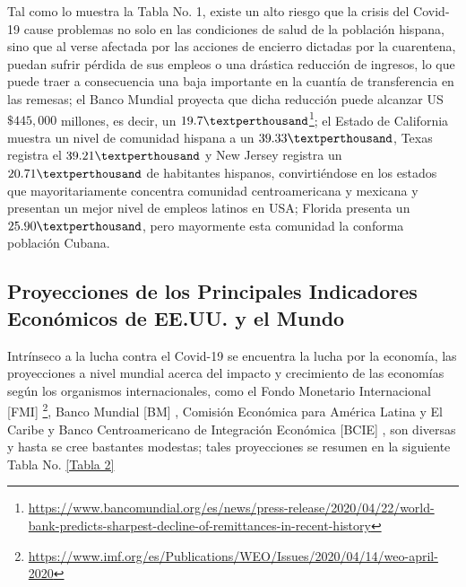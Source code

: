 Tal como lo muestra la Tabla No. 1, existe un alto riesgo que la crisis del Covid-19 cause problemas no solo en las condiciones de salud de la población hispana, sino que al verse afectada por las acciones de encierro dictadas por la cuarentena, puedan sufrir pérdida de sus empleos o una drástica reducción de ingresos, lo que puede traer a consecuencia una baja importante en la cuantía de transferencia en las remesas; el Banco Mundial proyecta que dicha reducción puede alcanzar US$\$ 445,000$ millones, es decir, un $19.7 \textperthousand$\footnote{\href{https://www.bancomundial.org/es/news/press-release/2020/04/22/world-bank-predicts-sharpest-decline-of-remittances-in-recent-history}{https://www.bancomundial.org/es/news/press-release/2020/04/22/world-bank-predicts-sharpest-decline-of-remittances-in-recent-history}}; el Estado de California muestra un nivel de comunidad hispana a un $39.33 \textperthousand$, Texas registra el $39.21 \textperthousand$ y New Jersey registra un $20.71 \textperthousand$ de habitantes hispanos, convirtiéndose en los estados que mayoritariamente concentra comunidad centroamericana y mexicana  y presentan un mejor nivel de empleos latinos en USA; Florida presenta un  $25.90 \textperthousand$, pero mayormente esta comunidad la conforma población Cubana.\\
 
\subsection{Proyecciones de los Principales Indicadores Económicos de EE.UU. y el Mundo}

Intrínseco a la lucha contra el Covid-19 se encuentra la lucha por la economía, las proyecciones a nivel mundial acerca del impacto y crecimiento de las economías según los organismos internacionales, como el Fondo Monetario Internacional [FMI] \footnote{\href{https://www.imf.org/es/Publications/WEO/Issues/2020/04/14/weo-april-2020}{https://www.imf.org/es/Publications/WEO/Issues/2020/04/14/weo-april-2020}}, Banco Mundial [BM] \cite{mundial2020economia}, Comisión Económica para América Latina y El Caribe \cite{cepal2020dimensionar} y Banco Centroamericano de Integración Económica [BCIE] \cite{penafiel2020pandemia}, son diversas y hasta se cree bastantes modestas; tales proyecciones se resumen en la siguiente Tabla No. \eqref{Tabla 2}

